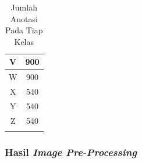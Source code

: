 \begin{center}
\begin{longtable}{|c|c|}
  V                                    & 900                     \\ \hline
  W                                    & 900                     \\ \hline
  X                                    & 540                     \\ \hline
  Y                                    & 540                     \\ \hline
  Z                                    & 540                     \\ \hline
  \caption{Jumlah Anotasi Pada Tiap Kelas}
  \label{tb:anotasitiapkelas}
  \end{longtable}
\end{center}
  

\subsubsection{Hasil \textit{Image Pre-Processing}}
\label{subsubsec:hasilpreprocess}

